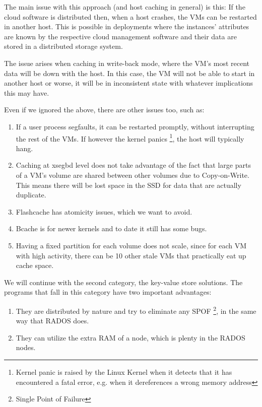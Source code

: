 The main issue with this approach (and host caching in general) is this: If the 
cloud software is distributed then, when a host crashes, the VMs can be 
restarted in another host. This is possible in deployments where the instances' 
attributes are known by the respective cloud management software and their data 
are stored in a distributed storage system. 

The issue arises when caching in write-back mode, where the VM's most recent 
data will be down with the host. In this case, the VM will not be able to start 
in another host or worse, it will be in inconsistent state with whatever 
implications this may have.

Even if we ignored the above, there are other issues too, such as:

\begin{enumerate}
	\item If a user process segfaults, it can be restarted promptly, 
		without interrupting the rest of the VMs. If however the kernel 
		panics
		\footnote{Kernel panic is raised by the Linux Kernel when it 
			detects that it has encountered a fatal error, e.g.  
			when it dereferences a wrong memory address},
		the host will typically hang.
	\item Caching at xsegbd level does not take advantage of the fact that 
		large parts of a VM's volume are shared between other volumes 
		due to Copy-on-Write. This means there will be lost space in 
		the SSD for data that are actually duplicate.
	\item Flashcache has atomicity issues, which we want to avoid.
	\item Bcache is for newer kernels and to date it still has some bugs.
	\item Having a fixed partition for each volume does not scale, since 
		for each VM with high activity, there can be 10 other stale VMs 
		that practically eat up cache space.
\end{enumerate}

We will continue with the second category, the key-value store solutions. The 
programs that fall in this category have two important advantages:

\begin{enumerate}
	\item They are distributed by nature and try to eliminate any SPOF
		\footnote{Single Point of Failure}, in the same way that RADOS does.
	\item They can utilize the extra RAM of a node, which is plenty in the 
		RADOS nodes.
\end{enumerate}

